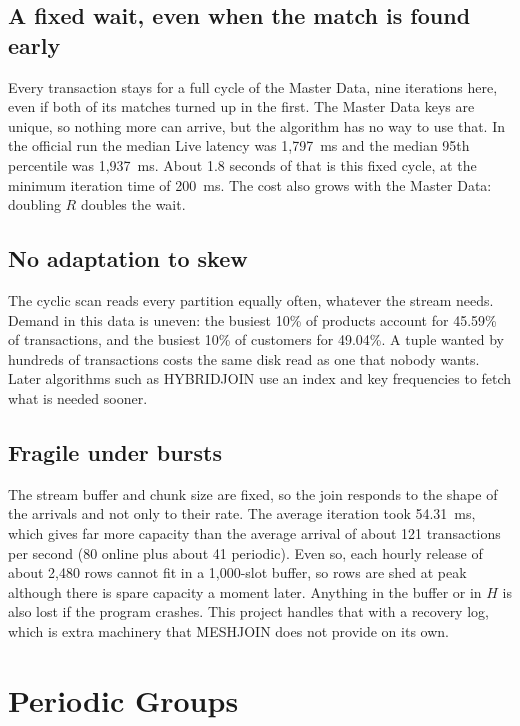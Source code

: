 \documentclass[11pt,a4paper]{article}
\begin{document}
\subsection{A fixed wait, even when the match is found early}

Every transaction stays for a full cycle of the Master Data, nine iterations here, even if both of its matches turned up in the first. The Master Data keys are unique, so nothing more can arrive, but the algorithm has no way to use that. In the official run the median Live latency was 1,797~ms and the median 95th percentile was 1,937~ms. About 1.8 seconds of that is this fixed cycle, at the minimum iteration time of 200~ms. The cost also grows with the Master Data: doubling $R$ doubles the wait.

\subsection{No adaptation to skew}

The cyclic scan reads every partition equally often, whatever the stream needs. Demand in this data is uneven: the busiest 10\% of products account for 45.59\% of transactions, and the busiest 10\% of customers for 49.04\%. A tuple wanted by hundreds of transactions costs the same disk read as one that nobody wants. Later algorithms such as HYBRIDJOIN use an index and key frequencies to fetch what is needed sooner.

\subsection{Fragile under bursts}

The stream buffer and chunk size are fixed, so the join responds to the shape of the arrivals and not only to their rate. The average iteration took 54.31~ms, which gives far more capacity than the average arrival of about 121 transactions per second (80 online plus about 41 periodic). Even so, each hourly release of about 2,480 rows cannot fit in a 1,000-slot buffer, so rows are shed at peak although there is spare capacity a moment later. Anything in the buffer or in $H$ is also lost if the program crashes. This project handles that with a recovery log, which is extra machinery that MESHJOIN does not provide on its own.

\section{Periodic Groups}
\end{document}
